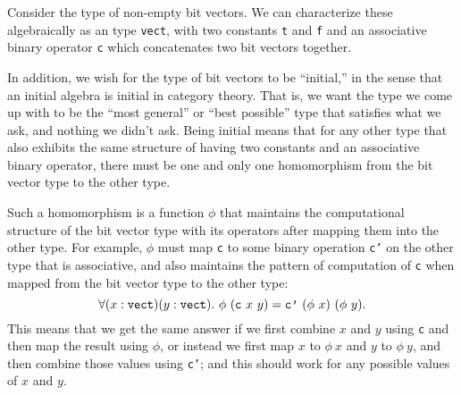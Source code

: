 Consider the type of non-empty bit vectors.  We can characterize these
algebraically as an \HOLW{} type \texttt{vect}, with two constants \texttt{t}
and \texttt{f} and an associative binary operator \texttt{c} which concatenates
two bit vectors together.

In addition, we wish for the type of bit vectors to be ``initial,'' in
the sense that an initial algebra is initial in category theory.
That is, we want the type we come up with to be the ``most general'' or
``best possible'' type that satisfies what we ask, and nothing we didn't ask.
Being initial means that for any other type that also exhibits the same
structure of having two constants and an associative binary operator, there
must be one and only one homomorphism from the bit vector type to the other
type.

Such a homomorphism is a function $\phi$ that maintains the computational
structure of the bit vector type with its operators
after mapping them into the other type.
For example, $\phi$ must map \texttt{c} to some binary operation
\texttt{c'} on the other type that is associative, and also maintains the
pattern of computation of \texttt{c} when mapped from the bit vector type
to the other type:
\[
\forall (x : \mbox{\tt vect}) (y : \mbox{\tt vect}) .\ 
\phi\ ( \mbox{\tt c}\ x\ y) = 
\mbox{\tt c'}\ (\phi\ x)\ (\phi\ y).
\]
This means that we get the same answer if we first combine $x$ and $y$ using
\texttt{c} and then map the result using $\phi$, or instead we first map
$x$ to $\phi\ x$ and $y$ to $\phi\ y$, and then combine those values using
\texttt{c'}; and this should work for any possible values of $x$ and $y$.

